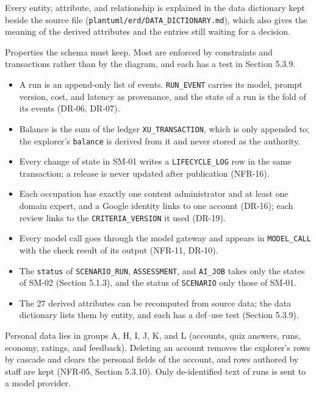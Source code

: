 Every entity, attribute, and relationship is explained in the data dictionary kept beside the source file (\texttt{plantuml/\allowbreak{}erd/\allowbreak{}DATA\_\allowbreak{}DICTIONARY.\allowbreak{}md}), which also gives the meaning of the derived attributes and the entries still waiting for a decision.

Properties the schema must keep. Most are enforced by constraints and transactions rather than by the diagram, and each has a test in Section 5.3.9.

\begin{itemize}[leftmargin=1.5em]
  \item A run is an append-only list of events. \texttt{RUN\_\allowbreak{}EVENT} carries its model, prompt version, cost, and latency as provenance, and the state of a run is the fold of its events (DR-06, DR-07).
  \item Balance is the sum of the ledger \texttt{XU\_\allowbreak{}TRANSACTION}, which is only appended to; the explorer's \texttt{balance} is derived from it and never stored as the authority.
  \item Every change of state in SM-01 writes a \texttt{LIFECYCLE\_\allowbreak{}LOG} row in the same transaction; a release is never updated after publication (NFR-16).
  \item Each occupation has exactly one content administrator and at least one domain expert, and a Google identity links to one account (DR-16); each review links to the \texttt{CRITERIA\_\allowbreak{}VERSION} it used (DR-19).
  \item Every model call goes through the model gateway and appears in \texttt{MODEL\_\allowbreak{}CALL} with the check result of its output (NFR-11, DR-10).
  \item The \texttt{status} of \texttt{SCENARIO\_\allowbreak{}RUN}, \texttt{ASSESSMENT}, and \texttt{AI\_\allowbreak{}JOB} takes only the states of SM-02 (Section 5.1.3), and the status of \texttt{SCENARIO} only those of SM-01.
  \item The 27 derived attributes can be recomputed from source data; the data dictionary lists them by entity, and each has a def--use test (Section 5.3.9).
\end{itemize}

Personal data lies in groups A, H, I, J, K, and L (accounts, quiz answers, runs, economy, ratings, and feedback). Deleting an account removes the explorer's rows by cascade and clears the personal fields of the account, and rows authored by staff are kept (NFR-05, Section 5.3.10). Only de-\allowbreak{}identified text of runs is sent to a model provider.

